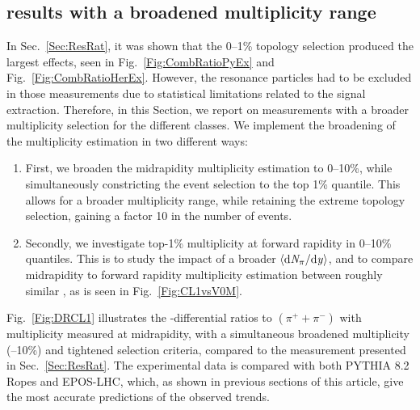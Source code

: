 \subsection{\SOPT results with a broadened multiplicity range}\label{Sec:ResExpMult}

In Sec.~\ref{Sec:ResRat}, it was shown that the 0--1\% topology selection produced the largest effects, seen in Fig.~\ref{Fig:CombRatioPyEx} and Fig.~\ref{Fig:CombRatioHerEx}. However, the resonance particles had to be excluded in those measurements due to statistical limitations related to the signal extraction.
Therefore, in this Section, we report on \SOPT measurements with a broader multiplicity selection for the different \SOPT classes. We implement the broadening of the multiplicity estimation in two different ways:

\begin{enumerate}
    \item First, we broaden the midrapidity multiplicity estimation to 0--10\%, while simultaneously constricting the \SOPT event selection to the top 1\% quantile. This allows for a broader multiplicity range, while retaining the extreme topology selection, gaining a factor 10 in the number of events.
    
    \item Secondly, we investigate top-1\% multiplicity at forward rapidity in 0--10\% \SOPT quantiles. This is  to study the impact of a broader $\langle \rm{d}\it{N}_{\pi}/\rm{d}\it{y} \rangle$, and to compare midrapidity to forward rapidity multiplicity estimation between roughly similar \dndeta, as is seen in Fig.~\ref{Fig:CL1vsV0M}.
\end{enumerate}

Fig.~\ref{Fig:DRCL1} illustrates the \SOPT-differential ratios to $(\pi^+ + \pi^-)$ with multiplicity measured at midrapidity, with a simultaneous broadened multiplicity (--10\%) and tightened \SOPT selection criteria, compared to the measurement presented in Sec.~\ref{Sec:ResRat}. The experimental data is compared with both PYTHIA 8.2 Ropes and EPOS-LHC,  which, as shown in previous sections of this article, give the most accurate predictions of the observed trends.

